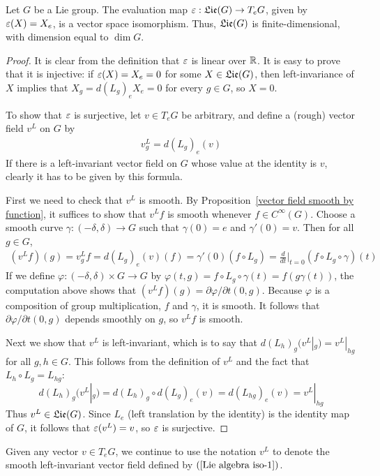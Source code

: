 \begin{theorem}\label{Lie algrbra iso tangent space}
Let $G$ be a Lie group. The evaluation map $\varepsilon:\mathfrak{Lie}(G)\to T_eG$, given by $\varepsilon(X)=X_e$, is a vector space isomorphism. Thus, $\mathfrak{Lie}(G)$ is finite-dimensional, with dimension equal to $\dim G$.
\end{theorem}
\begin{proof}
It is clear from the definition that $\varepsilon$ is linear over $\mathbb{R}$. It is easy to prove that it is injective: if $\varepsilon(X)=X_e=0$ for some $X\in\mathfrak{Lie}(G)$, then left-invariance of $X$ implies that $X_g=d(L_g)_eX_e=0$ for every $g\in G$, so $X=0$.\par
To show that $\varepsilon$ is surjective, let $v\in T_eG$ be arbitrary, and define a (rough) vector field $v^L$ on $G$ by
\begin{align}\label{Lie algebra iso-1}
v^L_g=d(L_g)_e(v)
\end{align}
If there is a left-invariant vector field on $G$ whose value at the identity is $v$, clearly it has to be given by this formula.\par
First we need to check that $v^L$ is smooth. By Proposition~\ref{vector field smooth by function}, it suffices to show that $v^Lf$ is smooth whenever $f\in C^\infty(G)$. Choose a smooth curve $\gamma:(-\delta,\delta)\to G$ such that $\gamma(0)=e$ and $\gamma'(0)=v$. Then for all $g\in G$,
\begin{align*}
(v^Lf)(g)=v^L_gf=d(L_g)_e(v)(f)=\gamma'(0)(f\circ L_g)=\frac{d}{dt}\Big|_{t=0}(f\circ L_g\circ\gamma)(t)
\end{align*}
If we define $\varphi:(-\delta,\delta)\times G\to G$ by $\varphi(t,g)=f\circ L_g\circ\gamma(t)=f(g\gamma(t))$, the computation above shows that $(v^Lf)(g)=\partial\varphi/\partial t(0,g)$. Because $\varphi$ is a composition of group multiplication, $f$ and $\gamma$, it is smooth. It follows that $\partial\varphi/\partial t(0,g)$ depends smoothly on $g$, so $v^Lf$ is smooth.\par
Next we show that $v^L$ is left-invariant, which is to say that $d(L_h)_g(v^L|_g)=v^L|_{hg}$ for all $g,h\in G$. This follows from the definition of $v^L$ and the fact that $L_h\circ L_g=L_{hg}$:
\[d(L_h)_g(v^L|_g)=d(L_h)_g\circ d(L_g)_e(v)=d(L_{hg})_e(v)=v^L|_{hg}\]
Thus $v^L\in\mathfrak{Lie}(G)$. Since $L_e$ (left translation by the identity) is the identity map of $G$, it follows that $\varepsilon(v^L)=v$, so $\varepsilon$ is surjective.
\end{proof}
Given any vector $v\in T_eG$, we continue to use the notation $v^L$ to denote the smooth left-invariant vector field defined by $(\ref{Lie algebra iso-1})$.\par
